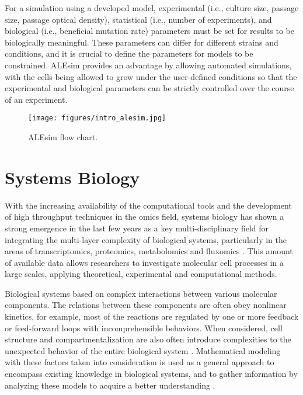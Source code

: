 For a simulation using a developed model, experimental (i.e., culture size, passage size, passage optical density), statistical (i.e., number of experiments), and biological (i.e., beneficial mutation rate) parameters must be set for results to be biologically meaningful. These parameters can differ for different strains and conditions, and it is crucial to define the parameters for models to be constrained. ALEsim provides an advantage by allowing automated simulations, with the cells being allowed to grow under the user-defined conditions so that the experimental and biological parameters can be strictly controlled over the course of an experiment.

\begin{figure}[H]
\begin{center}
\texttt{[image: figures/intro\_alesim.jpg]}
\caption[ALEsim flow chart]{ALEsim flow chart.}
\label{fig:intro_alesim}
\end{center}
\end{figure}


\section{Systems Biology}
With the increasing availability of the computational tools and the development of high throughput techniques in the omics field, systems biology has shown a strong emergence in the last few years as a key multi-disciplinary field for integrating the multi-layer complexity of biological systems, particularly in the areas of transcriptomics, proteomics, metabolomics and fluxomics \cite{kitano2002systems}. This amount of available data allows researchers to investigate molecular cell processes in a large scales, applying theoretical, experimental and computational methods.

Biological systems based on complex interactions between various molecular components. The relations between these components are often obey nonlinear kinetics, for example, most of the reactions are regulated by one or more feedback or feed-forward loops with incomprehensible behaviors. When considered, cell structure and compartmentalization are also often introduce complexities to the unexpected behavior of the entire biological system \cite{bellouquid2006mathematical}. Mathematical modeling with these factors taken into consideration is used as a general approach to encompass existing knowledge in biological systems, and to gather information by analyzing these models to acquire a better understanding \cite{kremling2013systems}.

